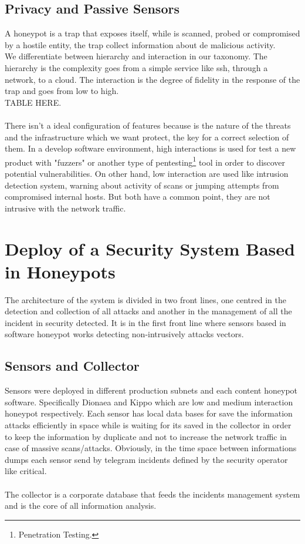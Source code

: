 \documentclass[a4paper]{llncs}
\begin{document}
\subsection{Privacy and Passive Sensors}
\label{sect:Privacy and Passive Sensors}
A honeypot is a trap that exposes itself, while is scanned, probed or compromised by a hostile entity, the trap collect information about de malicious activity.
\\We differentiate between hierarchy and interaction in our taxonomy. The hierarchy is the complexity goes from a simple service like ssh, through a network, to a cloud. The interaction is the degree of fidelity in the response of the trap and goes from low to high.\\TABLE HERE.\\\\There isn't a ideal configuration of features because is the nature of the threats and the infrastructure which we want protect, the key for a correct selection of them. In a develop software environment, high interactions is used for test a new product with "fuzzers" or another type of pentesting\footnote{Penetration Testing.} tool in order to discover potential vulnerabilities. On other hand, low interaction are used like intrusion detection system, warning about activity of scans or jumping attempts from compromised internal hosts. But both have a common point, they are not intrusive with the network traffic.


\section{Deploy of a Security System Based in Honeypots}

The architecture of the system is divided in two front lines, one centred in the detection and collection of all attacks and another in the management of all the incident in security detected. It is in the first front line where sensors based in software honeypot works detecting non-intrusively attacks vectors. 


\subsection{Sensors and Collector}

Sensors were deployed in different production subnets and each content honeypot software. Specifically Dionaea and Kippo which are low and medium interaction honeypot respectively. Each sensor has local data bases for save the information attacks efficiently in space while is waiting for its saved in the collector in order to keep the information by duplicate and not to increase the network traffic in case of massive scans/attacks. Obviously, in the time space between informations dumps each sensor send by telegram incidents  defined by the security operator like critical.\\\\The collector is a corporate database that feeds the incidents management system and is the core of all information analysis.
\end{document}
